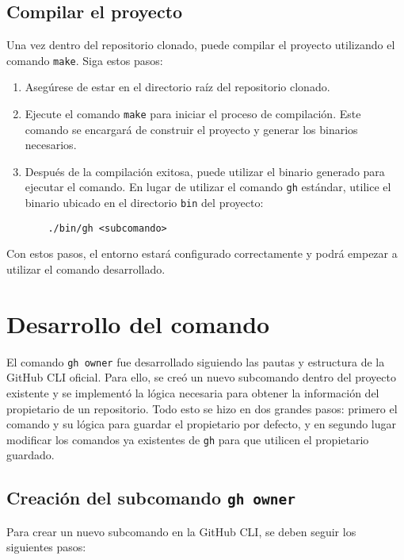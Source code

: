 \subsection{Compilar el proyecto}

Una vez dentro del repositorio clonado, puede compilar el proyecto utilizando el comando \texttt{make}. Siga estos pasos:

\begin{enumerate}
  \item Asegúrese de estar en el directorio raíz del repositorio clonado.
  \item Ejecute el comando \texttt{make} para iniciar el proceso de compilación. Este comando se encargará de construir el proyecto y generar los binarios necesarios.
  \item Después de la compilación exitosa, puede utilizar el binario generado para ejecutar el comando. En lugar de utilizar el comando \texttt{gh} estándar, utilice el binario ubicado en el directorio \texttt{bin} del proyecto:
        \begin{verbatim}
    ./bin/gh <subcomando>
  \end{verbatim}
\end{enumerate}

Con estos pasos, el entorno estará configurado correctamente y podrá empezar a utilizar el comando desarrollado.

\section{Desarrollo del comando}

El comando \texttt{gh owner} fue desarrollado siguiendo las pautas y estructura de la GitHub CLI oficial. Para ello, se creó un nuevo subcomando dentro del proyecto existente y se implementó la lógica necesaria para obtener la información del propietario de un repositorio. Todo esto se hizo en dos grandes pasos: primero el comando y su lógica para guardar el propietario por defecto, y en segundo lugar modificar los comandos ya existentes de \texttt{gh} para que utilicen el propietario guardado.

\subsection{Creación del subcomando \texttt{gh owner}}

Para crear un nuevo subcomando en la GitHub CLI, se deben seguir los siguientes pasos:

